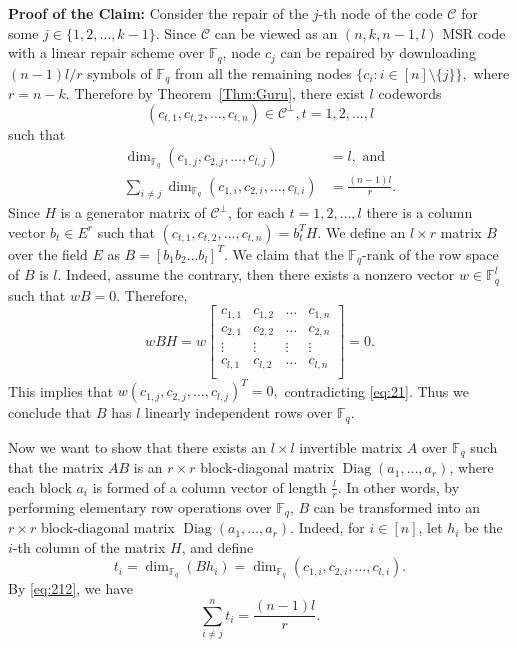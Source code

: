\documentclass[11pt,onecolumn]{IEEEtran}
\newcommand{\cC}{\mathcal{C}}
\DeclareMathOperator{\Diag}{Diag}
\begin{document}
{\bf Proof of the Claim:} Consider the repair of the $j$-th node of the code $\cC$ for some $j\in \{1,2,\dots,k-1\}$.
Since $\cC$ {can be viewed as} an $(n,k,n-1,l)$ MSR code with a linear repair scheme over $\mathbb{F}_q$, node
$c_j$ can be repaired by downloading $(n-1)l/r$ symbols of $\mathbb{F}_q$ from all the remaining nodes $\{c_i:i\in[n]\setminus\{j\}\},$ where $r=n-k.$ Therefore by  Theorem~\ref{Thm:Guru}, there exist $l$ codewords 
$$
(c_{t,1},c_{t,2},\dots,c_{t,n}) \in \cC^\perp, t=1,2,\dots,l
$$ 
such that
\begin{align}
\dim_{\mathbb{F}_q}(c_{1,j},c_{2,j},\dots,c_{l,j})&= l, \text{ and }  \label{eq:21}\\
\sum_{i\neq j} \dim_{\mathbb{F}_q}(c_{1,i},c_{2,i},\dots,c_{l,i})&=\frac{(n-1)l}{r}. \label{eq:212}
\end{align}
Since $H$ is a generator matrix of $\cC^\perp$, for each $t=1,2,\dots,l$ there is a column vector 
$b_t \in E^r$ such that $(c_{t,1},c_{t,2},\dots,c_{t,n})=b_t^T H$.
We define an $l \times r$ matrix $B$ over the field $E$ as $B=[b_1 b_2 \dots b_l]^T$.
We claim that the $\mathbb{F}_q$-rank of the row space of $B$ is $l$. Indeed, assume the contrary, then there  exists a nonzero vector $w\in \mathbb{F}_q^l$ such that $wB=0$. 
Therefore,
$$
wBH=w
\left[ \begin{array}{cccc}
c_{1,1} & c_{1,2} & \dots & c_{1,n} \\
c_{2,1} & c_{2,2} & \dots & c_{2,n} \\
\vdots & \vdots & \vdots & \vdots \\
c_{l,1} & c_{l,2} & \dots & c_{l,n} \\
\end{array} \right]=0.
$$ 
This implies that $w(c_{1,j},c_{2,j},\dots,c_{l,j})^T=0,$
contradicting \eqref{eq:21}. 
Thus we conclude that $B$ has $l$ linearly independent rows over $\mathbb{F}_q$.

Now we want to show that there exists an $l \times l$ invertible matrix $A$ over $\mathbb{F}_q$ such that the matrix $AB$ is an $r\times r$ block-diagonal matrix $\Diag(a_1,\dots,a_r)$, where each block $a_i$ is formed of a column vector of length $\frac{l}{r}$.
In other words, by performing elementary row operations over $\mathbb{F}_q$, $B$ can be transformed into an $r\times r$ block-diagonal matrix $\Diag(a_1,\dots,a_r)$.
Indeed, for $i\in[n]$, let  $h_i$ be the $i$-th column of the matrix $H$, and define 
$$
t_i=\dim_{\mathbb{F}_q}(Bh_i)
= \dim_{\mathbb{F}_q}(c_{1,i},c_{2,i},\dots,c_{l,i}).
$$
By \eqref{eq:212}, we have
\begin{equation} \label{eq:sumt}
\sum_{i\neq j}^n t_i =\frac{(n-1)l}{r}. 
\end{equation}
\end{document}
